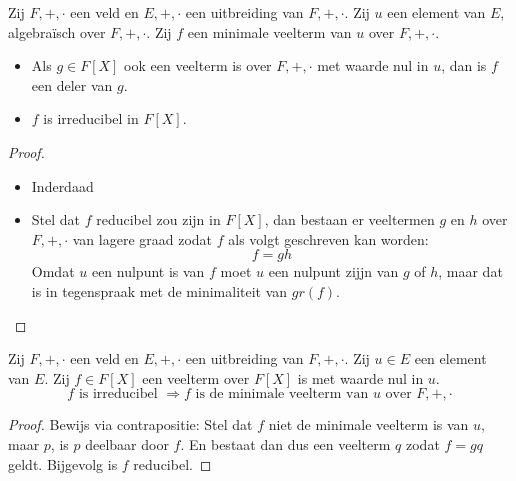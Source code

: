 \documentclass[main.tex]{subfiles}
\begin{document}
\begin{ei}
  \label{ei:minimale-veelterm-uniek-en-irreducibel}
  Zij $F,+,\cdot$ een veld en $E,+,\cdot$ een uitbreiding van $F,+,\cdot$.
  Zij $u$ een element van $E$, algebra\"isch over $F,+,\cdot$.
  Zij $f$ een minimale veelterm van $u$ over $F,+,\cdot$.
  \begin{itemize}
  \item Als $g \in F[X]$ ook een veelterm is over $F,+,\cdot$ met waarde nul in $u$, dan is $f$ een deler van $g$.
  \item $f$ is irreducibel in $F[X]$.
  \end{itemize}

  \begin{proof}
    \begin{itemize}
    \item Inderdaad
    \item Stel dat $f$ reducibel zou zijn in $F[X]$, dan bestaan er veeltermen $g$ en $h$ over $F,+,\cdot$ van lagere graad zodat $f$ als volgt geschreven kan worden:
      \[ f = gh \]
      Omdat $u$ een nulpunt is van $f$ moet $u$ een nulpunt zijjn van $g$ of $h$, maar dat is in tegenspraak met de minimaliteit van $gr(f)$.
    \end{itemize}
  \end{proof}
\end{ei}

\begin{ei}
  Zij $F,+,\cdot$ een veld en $E,+,\cdot$ een uitbreiding van $F,+,\cdot$.
  Zij $u\in E$ een element van $E$.
  Zij $f\in F[X]$ een veelterm over $F[X]$ is met waarde nul in $u$.
  \[ f \text{ is irreducibel } \Rightarrow f \text{ is de minimale veelterm van } u \text{ over } F,+,\cdot \]

  \begin{proof}
    Bewijs via contrapositie:
    Stel dat $f$ niet de minimale veelterm is van $u$, maar $p$, is $p$ deelbaar door $f$. En bestaat dan dus een veelterm $q$ zodat $f=gq$ geldt.
    Bijgevolg is $f$ reducibel.
  \end{proof}
\end{ei}
\end{document}
